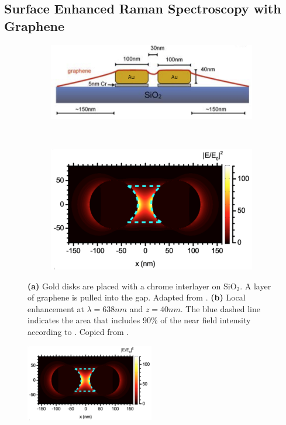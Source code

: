 \subsection{Surface Enhanced Raman Spectroscopy with Graphene}

\begin{figure}[!h]
  \centering
  \begin{subfigure}{0.45\textwidth}
    \includegraphics[width=\textwidth]{./images/sers-schema.png}
  \end{subfigure}
  ~
  \begin{subfigure}{0.45\textwidth}
    \includegraphics[width=\textwidth]{./images/local-enhancement-heeg.png}
  \end{subfigure}
  \caption{\textbf{(a)} Gold disks are placed with a chrome interlayer on SiO$_2$. A layer of graphene is pulled into the gap. Adapted from \cite{heeg}. \textbf{(b)} Local enhancement at $\lambda = 638nm$ and $z=40nm$. The blue dashed line indicates the area that includes 90\% of the near field intensity according to \cite{heeg}. Copied from \cite{heeg}.}
\end{figure}

\begin{figure}[!h]
  \centering
  \includegraphics[width=0.5\textwidth]{./images/local-enhancement-heeg.png}
\end{figure}

